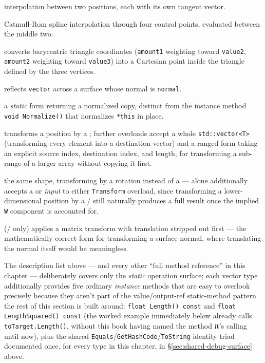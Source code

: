 \begin{description}
  interpolation between two positions, each with its own tangent vector.
\item[\texttt{CatmullRom(value1, value2, value3, value4, amount)}] Catmull-Rom spline
  interpolation through four control points, evaluated between the middle two.
\item[\texttt{Barycentric(value1, value2, value3, amount1, amount2)}] converts barycentric
  triangle coordinates (\texttt{amount1} weighting toward \texttt{value2}, \texttt{amount2}
  weighting toward \texttt{value3}) into a Cartesian point inside the triangle defined by the
  three vertices.
\item[\texttt{Reflect(vector, normal)}] reflects \texttt{vector} across a surface whose normal
  is \texttt{normal}.
\item[\texttt{Normalize(value)}] a \emph{static} form returning a normalized copy, distinct from
  the instance method \texttt{void Normalize()} that normalizes \texttt{*this} in place.
\item[\texttt{Transform(position, matrix)}] transforms a position by a ;
  further overloads accept a whole \texttt{std::vector<T>} (transforming every element into a
  destination vector) and a ranged form taking an explicit source index, destination index, and
  length, for transforming a sub-range of a larger array without copying it first.
\item[\texttt{Transform(value, rotation)}] the same shape, transforming by a
   rotation instead of a  ---  alone
  additionally accepts a  or  \emph{input} to either
  \texttt{Transform} overload, since transforming a lower-dimensional position by a
  / still naturally produces a full 
  result once the implied \texttt{W} component is accounted for.
\item[\texttt{TransformNormal(normal, matrix)}] (/ only)
  applies a matrix transform with translation stripped out first --- the mathematically correct
  form for transforming a surface normal, where translating the normal itself would be
  meaningless.
\end{description}

The description list above --- and every other ``full method reference'' in this chapter ---
deliberately covers only the \emph{static} operation surface; each vector type additionally
provides five ordinary \emph{instance} methods that are easy to overlook precisely because
they aren't part of the value/output-ref static-method pattern the rest of this section is
built around: \texttt{float Length() const} and \texttt{float LengthSquared() const} (the
worked example immediately below already calls \texttt{toTarget.Length()}, without this book
having named the method it's calling until now), plus the shared
\texttt{Equals}/\texttt{GetHashCode}/\texttt{ToString} identity triad documented once, for
every type in this chapter, in \S\ref{sec:shared-debug-surface} above.

